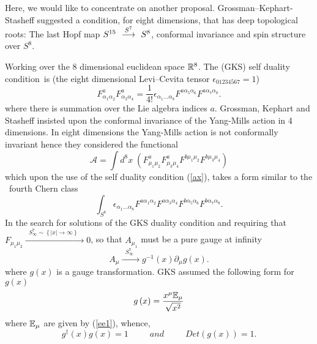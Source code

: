\documentclass[a4paper,12pt]{book}
\begin{document}
Here, we would like to concentrate on another proposal.
Grossman--Kephart-Stasheff \cite{gks} suggested a condition, for eight
dimensions, that has deep topological roots: The last Hopf map $S^{15}{%
\stackrel{\quad S^{7}\quad }{\longrightarrow }}S^{8}$, conformal invariance
and spin structure over $S^{8}$\cite{landi}.

Working over the 8 dimensional euclidean space $\Bbb{R}^{8}$. The (GKS) self
duality condition\ is (the eight dimensional Levi--Cevita tensor $\epsilon
_{01234567}=1$) 
\begin{equation}
F_{\alpha _{1}\alpha _{2}}^{a}F_{\alpha _{3}\alpha _{4}}^{a}=\frac{1}{4!}%
\epsilon _{\alpha _{1}\ldots \alpha _{8}}F^{a\alpha _{5}\alpha
_{6}}F^{a\alpha _{7}\alpha _{8}}.  \label{ax}
\end{equation}
where there is summation over the Lie algebra indices $a$. Grossman, Kephart
and Stasheff insisted upon the conformal invariance of the Yang-Mills action
in 4 dimensions. In eight dimensions the Yang-Mills action is not
conformally invariant hence they considered the functional 
\begin{equation}
\mathcal{A}=\int d^{8}x\;\left( F_{\mu _{1}\mu _{2}}^{a}F_{\mu _{3}\mu
_{4}}^{a}F^{b\mu _{1}\mu _{2}}F^{b\mu _{3}\mu _{4}}\right)
\end{equation}
which upon the use of the self duality condition (\ref{ax}), takes a form
similar to the \ fourth Chern class 
\begin{equation}
\int_{S^{8}}\epsilon _{\alpha _{1}\ldots \alpha _{8}}F^{a\alpha _{1}\alpha
_{2}}F^{a\alpha _{3}\alpha _{4}}F^{b\alpha _{5}\alpha _{6}}F^{b\alpha
_{7}\alpha _{8}}.
\end{equation}
In the search for solutions of the GKS duality condition and requiring that $%
F_{\mu _{1}\mu _{2}}\stackrel{\;\;S_{\infty }^{7}\sim \left\{ \left|
x\right| \rightarrow \infty \right\} \quad }{\longrightarrow }0$, so that $%
A_{\mu _{1}}$ must be a pure gauge at infinity 
\begin{equation}
A_{\mu }\stackrel{\;\;S_{\infty }^{7}\quad }{\longrightarrow }g^{-1}\left(
x\right) \partial _{\mu }g\left( x\right) .
\end{equation}
where $g\left( x\right) $ is a gauge transformation. GKS assumed the
following form for $g\left( x\right) $%
\begin{equation}
g\left( x\right) =\frac{x^{\mu }\Bbb{E}_{\mu }}{\sqrt{x^{2}}}
\end{equation}
where $\Bbb{E}_{\mu }$ are given by (\ref{ee1}), whence, 
\begin{equation}
g^{\dagger }\left( x\right) g\left( x\right)
=1\;\;\;\;\;\;\;\;\;and\;\;\;\;\;\;\;\;\;Det\left( g\left( x\right) \right)
=1.
\end{equation}
\end{document}
